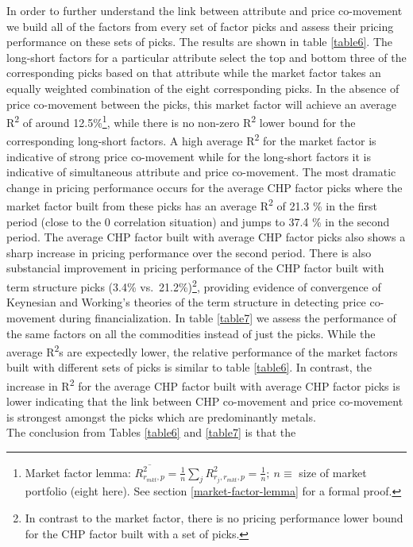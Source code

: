 \documentclass[12pt,]{article}
\let\rmarkdownfootnote\footnote%
\def\footnote{\protect\rmarkdownfootnote}
\begin{document}
In order to further understand the link between attribute and price
co-movement we build all of the factors from every set of factor picks
and assess their pricing performance on these sets of picks. The results
are shown in table \ref{table6}. The long-short factors for a particular
attribute select the top and bottom three of the corresponding picks
based on that attribute while the market factor takes an equally
weighted combination of the eight corresponding picks. In the absence of
price co-movement between the picks, this market factor will achieve an
average R\textsuperscript{2} of around 12.5\%\footnote{Market factor
  lemma:
  \(\overline{R_{r_{mkt}, p}^{2}} = \frac{1}{n} \sum_{j} R_{r_{j}, r_{mkt}, p}^{2} = \frac{1}{n}; \: n\equiv\)
  size of market portfolio (eight here). See section
  \ref{market-factor-lemma} for a formal proof.}, while there is no
non-zero R\textsuperscript{2} lower bound for the corresponding
long-short factors. A high average R\textsuperscript{2} for the market
factor is indicative of strong price co-movement while for the
long-short factors it is indicative of simultaneous attribute and price
co-movement. The most dramatic change in pricing performance occurs for
the average CHP factor picks where the market factor built from these
picks has an average R\textsuperscript{2} of 21.3 \% in the first period
(close to the 0 correlation situation) and jumps to 37.4 \% in the
second period. The average CHP factor built with average CHP factor
picks also shows a sharp increase in pricing performance over the second
period. There is also substancial improvement in pricing performance of
the CHP factor built with term structure picks (3.4\%
vs.~21.2\%)\footnote{In contrast to the market factor, there is no
  pricing performance lower bound for the CHP factor built with a set of
  picks.}, providing evidence of convergence of Keynesian and Working's
theories of the term structure in detecting price co-movement during
financialization. In table \ref{table7} we assess the performance of the
same factors on all the commodities instead of just the picks. While the
average R\textsuperscript{2}s are expectedly lower, the relative
performance of the market factors built with different sets of picks is
similar to table \ref{table6}. In contrast, the increase in
R\textsuperscript{2} for the average CHP factor built with average CHP
factor picks is lower indicating that the link between CHP co-movement
and price co-movement is strongest amongst the picks which are
predominantly metals.\\
The conclusion from Tables \ref{table6} and \ref{table7} is that the
\end{document}
